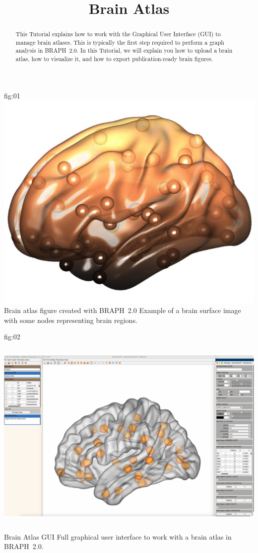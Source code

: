 \documentclass[justified]{tufte-handout}
\title{Brain Atlas}
\begin{document}
\maketitle
	
	{fig:01}
	{\includegraphics{fig01.jpg}}
	{Brain atlas figure created with BRAPH~2.0}
	{
	Example of a brain surface image with some nodes representing brain regions.
	}

\begin{abstract}
\noindent
This Tutorial explains how to work with the Graphical User Interface (GUI) to manage brain atlases.
This is typically the first step required to perform a graph analysis in BRAPH~2.0. 
In this Tutorial, we will explain you how to upload a brain atlas, how to visualize it, and how to export publication-ready brain figures.
\end{abstract}

\tableofcontents

	{fig:02}
	{\includegraphics[height=10cm]{fig02.jpg}}
	{Brain Atlas GUI}
	{
	Full graphical user interface to work with a brain atlas in BRAPH~2.0. 
	}
\end{document}
